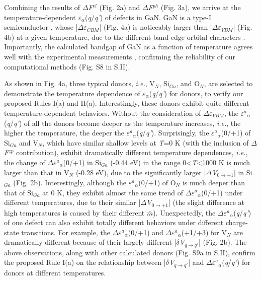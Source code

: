 \documentclass[onecolumn,preprint,superscriptaddress]{revtex4-1}
\begin{document}
Combining the results of $\Delta$\emph{F}$^{el}$ (Fig. 2a) and $\Delta$\emph{F}$^{ph}$ (Fig. 3a), we arrive at the temperature-dependent $\varepsilon$$_{\alpha}$(\emph{q}/\emph{q'}) of defects in GaN. GaN is a type-I semiconductor \cite{33}, whose |$\Delta$$\varepsilon$$_{CBM}$| (Fig. 4a) is noticeably larger than |$\Delta$$\varepsilon$$_{VBM}$| (Fig. 4b) at a given temperature, due to the different band-edge orbital characters \cite{33,49}. Importantly, the calculated bandgap of GaN as a function of temperature agrees well with the experimental measurements \cite{34}, confirming the reliability of our computational methods (Fig. S8 in S.II).

As shown in Fig. 4a, three typical donors, \emph{i.e.}, V$_N$, Si$_{Ga}$, and O$_N$, are selected to demonstrate the temperature dependence of $\varepsilon$$_{\alpha}$(\emph{q}/\emph{q'}) for donors, to verify our proposed Rules I(a) and II(a). Interestingly, these donors exhibit quite different temperature-dependent behaviors. Without the consideration of $\Delta$$\varepsilon$$_{VBM}$, the $\varepsilon$$^{a}$$_{\alpha}$(\emph{q}/\emph{q'}) of all the donors become deeper as the temperature increases, \emph{i.e.}, the higher the temperature, the deeper the $\varepsilon$$^{a}$$_{\alpha}$(\emph{q}/\emph{q'}). Surprisingly, the $\varepsilon$$^{a}$$_{\alpha}$(0/+1) of Si$_{Ga}$ and V$_N$, which have similar shallow levels at \emph{T}=0 K (with the inclusion of $\Delta$\emph{F}$^{zp}$ contribution), exhibit dramatically different temperature dependences, \emph{i.e.}, the change of $\Delta$$\varepsilon$$^{a}$$_{\alpha}$(0/+1) in Si$_{Ga}$ (-0.44 eV) in the range 0<\emph{T}<1000 K is much larger than that in V$_N$ (-0.28 eV), due to the significantly larger |$\Delta$\emph{V}$_{0\rightarrow +1}$| in Si$_{Ga}$ (Fig. 2b). Interestingly, although the $\varepsilon$$^{a}$$_{\alpha}$(0/+1) of O$_N$ is much deeper than that of Si$_{Ga}$ at 0 K, they exhibit almost the same trend of $\Delta$$\varepsilon$$^{a}$$_{\alpha}$(0/+1) under different temperatures, due to their similar |$\Delta$\emph{V}$_{0\rightarrow +1}$| (the slight difference at high temperatures is caused by their different $\bar{m}$). Unexpectedly, the $\Delta$$\varepsilon$$^{a}$$_{\alpha}$(\emph{q}/\emph{q'}) of one defect can also exhibit totally different behaviors under different charge-state transitions. For example, the $\Delta$$\varepsilon$$^{a}$$_{\alpha}$(0/+1) and $\Delta$$\varepsilon$$^{a}$$_{\alpha}$(+1/+3) for V$_N$ are dramatically different because of their largely different |$\delta$\emph{V}$_{q\rightarrow q'}$| (Fig. 2b). The above observations, along with other calculated donors (Fig. S9a in S.II), confirm the proposed Rule I(a) on the relationship between |$\delta$\emph{V}$_{q\rightarrow q'}$| and $\Delta$$\varepsilon$$^{a}$$_{\alpha}$(\emph{q}/\emph{q'}) for donors at different temperatures.
\end{document}
